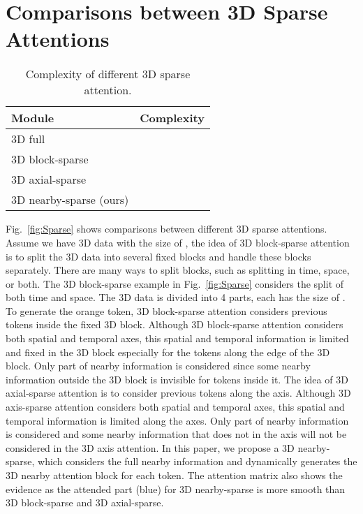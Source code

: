 \documentclass[10pt,twocolumn,letterpaper]{article}
\begin{document}
\section{Comparisons between 3D Sparse Attentions}

\begin{table}[t]
\footnotesize
\begin{center}
\caption{Complexity of different 3D sparse attention.}
\label{tab:sparse}
\begin{tabular}{p{3.6cm}p{3.5cm}}
\toprule
Module         & Complexity \\
\midrule
3D full  &       \\
3D block-sparse~\cite{weissenbornScalingAutoregressiveVideo2020, rakhimovLatentVideoTransformer2020}     &       \\
3D axial-sparse~\cite{hoAxialAttentionMultidimensional2019, rameshZeroShotTexttoImageGeneration2021, wuGODIVAGeneratingOpenDomaIn2021}   &    \\
3D nearby-sparse (ours)    &       \\
\bottomrule
\end{tabular}
\end{center}
\end{table}

Fig.~\ref{fig:Sparse} shows comparisons between different 3D sparse attentions. Assume we have 3D data with the size of , the idea of 3D block-sparse attention is to split the 3D data into several fixed blocks and handle these blocks separately. There are many ways to split blocks, such as splitting in time, space, or both. The 3D block-sparse example in Fig.~\ref{fig:Sparse} considers the split of both time and space. The 3D data is divided into 4 parts, each has the size of . To generate the orange token, 3D block-sparse attention considers previous tokens inside the fixed 3D block. Although 3D block-sparse attention considers both spatial and temporal axes, this spatial and temporal information is limited and fixed in the 3D block especially for the tokens along the edge of the 3D block. Only part of nearby information is considered since some nearby information outside the 3D block is invisible for tokens inside it. The idea of 3D axial-sparse attention is to consider previous tokens along the axis. Although 3D axis-sparse attention considers both spatial and temporal axes, this spatial and temporal information is limited along the axes. Only part of nearby information is considered and some nearby information that does not in the axis will not be considered in the 3D axis attention. In this paper, we propose a 3D nearby-sparse, which considers the full nearby information and dynamically generates the 3D nearby attention block for each token. The attention matrix also shows the evidence as the attended part (blue) for 3D nearby-sparse is more smooth than 3D block-sparse and 3D axial-sparse.
\end{document}

